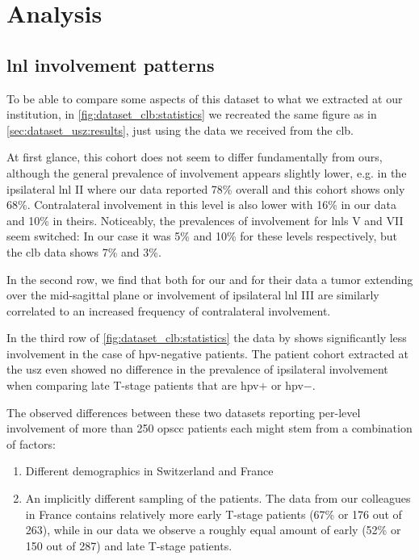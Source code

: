 \documentclass[\relativeRoot/main.tex]{subfiles}
\begin{document}
\section{Analysis}
\label{sec:dataset_clb:analysis}

\subsection{\acrshort{lnl} involvement patterns}
\label{subsec:dataset_clb:analysis:patterns}

To be able to compare some aspects of this dataset to what we extracted at our institution, in \cref{fig:dataset_clb:statistics} we recreated the same figure as in \cref{sec:dataset_usz:results}, just using the data we received from the \acrlong{clb}.

At first glance, this cohort does not seem to differ fundamentally from ours, although the general prevalence of involvement appears slightly lower, e.g. in the ipsilateral \gls{lnl} II where our data reported 78\% overall and this cohort shows only 68\%. Contralateral involvement in this level is also lower with 16\% in our data and 10\% in theirs. Noticeably, the prevalences of involvement for \glspl{lnl} V and VII seem switched: In our case it was 5\% and 10\% for these levels respectively, but the \gls{clb} data shows 7\% and 3\%.

In the second row, we find that both for our and for their data a tumor extending over the mid-sagittal plane or involvement of ipsilateral \gls{lnl} III are similarly correlated to an increased frequency of contralateral involvement.

In the third row of \cref{fig:dataset_clb:statistics} the data by  shows significantly less involvement in the case of \gls{hpv}-negative patients. The patient cohort extracted at the \gls{usz} even showed no difference in the prevalence of ipsilateral involvement when comparing late T-stage patients that are \gls{hpv}$+$ or \gls{hpv}$-$.

The observed differences between these two datasets reporting per-level involvement of more than 250 \gls{opscc} patients each might stem from a combination of factors:

\begin{enumerate}
    \item Different demographics in Switzerland and France
    \item An implicitly different sampling of the patients. The data from our colleagues in France contains relatively more early T-stage patients (67\% or 176 out of 263), while in our data we observe a roughly equal amount of early (52\% or 150 out of 287) and late T-stage patients.
\end{enumerate}
\end{document}
